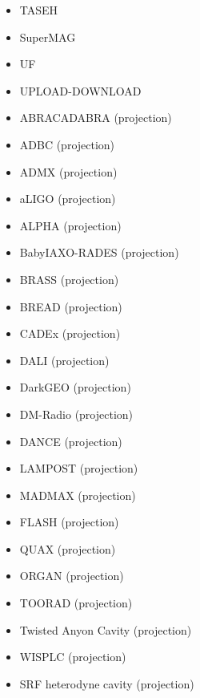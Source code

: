 \documentclass[8pt,twocolumn]{extarticle}
\begin{document}
\begin{mdframed}[everyline=true]
\begin{itemize}
    \item TASEH~\cite{TASEH:2022vvu}
    \item SuperMAG~\cite{Arza:2021ekq}
    \item UF~\cite{Hagmann}
    \item UPLOAD-DOWNLOAD~\cite{Thomson:2019aht,Thomson:2023moc}
    \item ABRACADABRA (projection)~\cite{ABRACADABRA}
	\item ADBC (projection)~\cite{Liu:2018icu} 
	\item ADMX (projection)~\cite{Stern:2016bbw}
              \item aLIGO (projection)~\cite{Nagano:2019rbw} 
           \item ALPHA (projection)~\cite{Lawson:2019brd,Millar:2022peq} 
           \item BabyIAXO-RADES (projection)~\cite{Ahyoune:2023gfw}
           \item BRASS (projection)~\cite{BRASS}
           \item BREAD (projection)~\cite{Liu:2021pei}
           \item CADEx (projection)~\cite{Aja:2022csb}
           \item DALI (projection)~\cite{DeMiguel:2023nmz}
           \item DarkGEO (projection)~\cite{Heinze:2024bdc}
    \item DM-Radio (projection)~\cite{DMRadio,DMRadio:2022pkf}
     \item DANCE (projection)~\cite{Michimura:2019qxr} 
           \item LAMPOST (projection)~\cite{Baryakhtar:2018doz} 
      \item MADMAX (projection)~\cite{Beurthey:2020yuq} 
           \item FLASH (projection)~\cite{Alesini:2017ifp,Alesini:2023qed} 
           \item QUAX (projection)~\cite{QUAX} 
                 \item ORGAN (projection)~\cite{McAllister:2017lkb} 
                       \item TOORAD (projection)~\cite{Schutte-Engel:2021bqm} 
                       \item Twisted Anyon Cavity (projection)~\cite{Bourhill:2022alm}
                       \item WISPLC (projection)~\cite{Zhang:2021bpa} 
                       \item SRF heterodyne cavity (projection)~\cite{Berlin:2020vrk}


\end{itemize}
\end{mdframed}
\end{document}
